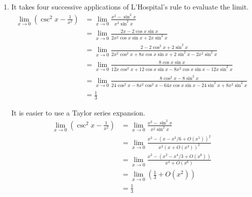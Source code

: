 \begin{Solution}
\begin{enumerate}
\begin{align*}
      \right] \\
      &= \lim_{x \to +\infty} \left[ \frac{\ln\left(1+\frac{1}{x}\right)}
        {1/x} \right] \\
      &= \lim_{x \to +\infty} \left[ \frac{\left(1+\frac{1}{x}\right)^{-1}
          \left(-\frac{1}{x^2}\right)}
        {-1/x^2} \right] \\
      &= \lim_{x \to +\infty} \left[ \left(1+\frac{1}{x}\right)^{-1}
      \right] \\
      &= 1
    \end{align*}
    Thus we have
    \[
    \boxed{
      \lim_{x \to +\infty} \left[ \left(1 + \frac{1}{x} \right)^x \right] = e.
      }
    \]
  \item
    It takes four successive applications of L'Hospital's rule to evaluate
    the limit.
    \begin{align*}
      \lim_{x \to 0} \left( \csc^2 x - \frac{1}{x^2} \right)
      &= \lim_{x \to 0} \frac{x^2 - \sin^2 x}{ x^2 \sin^2 x } \\
      &= \lim_{x \to 0} \frac{ 2 x - 2 \cos x \sin x }
      { 2 x^2 \cos x \sin x + 2 x \sin^2 x } \\
      &= \lim_{x \to 0} \frac{2 - 2 \cos^2 x + 2 \sin^2 x }
      { 2 x^2 \cos^2 x + 8 x \cos x \sin x + 2 \sin^2 x
        - 2 x^2 \sin^2 x } \\
      &= \lim_{x \to 0} \frac{ 8 \cos x \sin x }
      { 12 x \cos^2 x + 12 \cos x \sin x - 8 x^2 \cos x \sin x
        - 12 x \sin^2 x } \\
      &= \lim_{x \to 0} \frac{ 8 \cos^2 x - 8 \sin^2 x }
      { 24 \cos^2 x - 8 x^2 \cos^2 x - 64 x \cos x \sin x
        - 24 \sin^2 x + 8 x^2 \sin^2 x } \\
      &= \frac{1}{3}
    \end{align*}

    It is easier to use a Taylor series expansion.
    \begin{align*}
      \lim_{x \to 0} \left( \csc^2 x - \frac{1}{x^2} \right)
      &= \lim_{x \to 0} \frac{x^2 - \sin^2 x}{ x^2 \sin^2 x } \\
      &= \lim_{x \to 0} \frac{x^2 - (x - x^3/6 + O(x^5))^2}
      { x^2 (x + O(x^3))^2 } \\
      &= \lim_{x \to 0} \frac{x^2 - (x^2 - x^4/3 + O(x^6))}
      { x^4 + O(x^6) } \\
      &= \lim_{x \to 0} \left( \frac{1}{3} + O(x^2) \right) \\
      &= \frac{1}{3}
    \end{align*}
  \end{enumerate}
  \renewcommand{\theenumi}{\arabic{enumi}}
\end{Solution}







